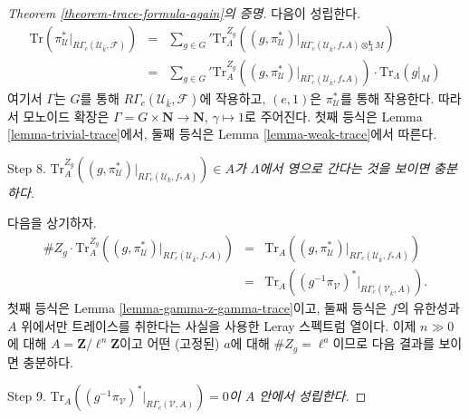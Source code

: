 \begin{proof}[Theorem \ref{theorem-trace-formula-again}의 증명]
\medskip\noindent
다음이 성립한다.
\begin{eqnarray*}
\text{Tr}(
\pi_\mathcal{U}^* |_{R\Gamma_c(\mathcal{U}_{\bar k}, \mathcal{F})})
& = &
{\sum_{g \in G}}'
\text{Tr}_{\Lambda}^{Z_g}
\left(
(g, \pi_\mathcal{U}^*)
|_{R\Gamma_c(\mathcal{U}_{\bar k}, f_*A)\otimes_A^\mathbf{L} M}
\right) \\
& = &
{\sum_{g\in G}}'
\text{Tr}_A^{Z_g}
(
(g, \pi_\mathcal{U}^*) |_{R\Gamma_c(\mathcal{U}_{\bar k}, f_*A)}
)
\cdot
\text{Tr}_\Lambda(g|_M)
\end{eqnarray*}
여기서 $\Gamma$는 $G$를 통해
$R\Gamma_c(\mathcal{U}_{\bar k}, \mathcal{F})$에 작용하고,
$(e, 1)$은 $\pi_\mathcal{U}^*$를 통해 작용한다. 따라서 모노이드
확장은 $\Gamma = G \times \mathbf{N} \to \mathbf{N}$,
$\gamma \mapsto 1$로 주어진다. 첫째 등식은 Lemma
\ref{lemma-trivial-trace}에서, 둘째 등식은 Lemma
\ref{lemma-weak-trace}에서 따른다.

\medskip\noindent
Step 8. {\it
$\text{Tr}_A^{Z_g}((g, \pi_\mathcal{U}^*)
|_{R\Gamma_c(\mathcal{U}_{\bar k}, f_*A)}) \in A$가
$\Lambda$에서 영으로 간다는 것을 보이면 충분하다.
}

\medskip\noindent
다음을 상기하자.
\begin{eqnarray*}
\# Z_g \cdot \text{Tr}_A^{Z_g}((g, \pi_\mathcal{U}^*)
|_{R\Gamma_c(\mathcal{U}_{\bar k}, f_*A)})
& = & \text{Tr}_A((g, \pi_\mathcal{U}^*)
|_{R\Gamma_c(\mathcal{U}_{\bar k}, f_*A)})\\
& = &
\text{Tr}_A((g^{-1}\pi_\mathcal{V})^* |_{R\Gamma_c(\mathcal{V}_{\bar k}, A)}).
\end{eqnarray*}
첫째 등식은 Lemma \ref{lemma-gamma-z-gamma-trace}이고, 둘째 등식은
$f$의 유한성과 $A$ 위에서만 트레이스를 취한다는 사실을 사용한
Leray 스펙트럼 열이다. 이제 $n \gg 0$에 대해
$A=\mathbf{Z}/\ell^n\mathbf{Z}$이고 어떤 (고정된) $a$에 대해
$\# Z_g = \ell^a$이므로 다음 결과를 보이면 충분하다.

\medskip\noindent
Step 9. {\it
$\text{Tr}_A((g^{-1}\pi_\mathcal{V})^* |_{R\Gamma_c(\mathcal{V}, A)}) = 0$이
$A$ 안에서 성립한다.}


\end{proof}
